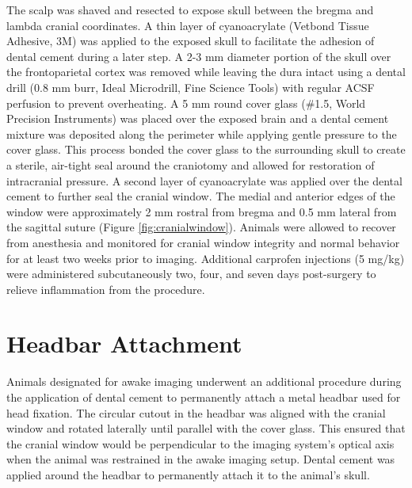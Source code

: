 The scalp was shaved and resected to expose skull between the bregma and lambda cranial coordinates. A thin layer of cyanoacrylate (Vetbond Tissue Adhesive, 3M) was applied to the exposed skull to facilitate the adhesion of dental cement during a later step. A 2-3 mm diameter portion of the skull over the frontoparietal cortex was removed while leaving the dura intact using a dental drill (0.8 mm burr, Ideal Microdrill, Fine Science Tools) with regular ACSF perfusion to prevent overheating. A 5 mm round cover glass (\#1.5, World Precision Instruments) was placed over the exposed brain and a dental cement mixture was deposited along the perimeter while applying gentle pressure to the cover glass. This process bonded the cover glass to the surrounding skull to create a sterile, air-tight seal around the craniotomy and allowed for restoration of intracranial pressure. A second layer of cyanoacrylate was applied over the dental cement to further seal the cranial window. The medial and anterior edges of the window were approximately 2 mm rostral from bregma and 0.5 mm lateral from the sagittal suture (Figure \ref{fig:cranialwindow}). Animals were allowed to recover from anesthesia and monitored for cranial window integrity and normal behavior for at least two weeks prior to imaging. Additional carprofen injections (5 mg/kg) were administered subcutaneously two, four, and seven days post-surgery to relieve inflammation from the procedure.


\section{Headbar Attachment} \label{app:headbar_attachment}

Animals designated for awake imaging underwent an additional procedure during the application of dental cement to permanently attach a metal headbar used for head fixation. The circular cutout in the headbar was aligned with the cranial window and rotated laterally until parallel with the cover glass. This ensured that the cranial window would be perpendicular to the imaging system's optical axis when the animal was restrained in the awake imaging setup. Dental cement was applied around the headbar to permanently attach it to the animal's skull.


